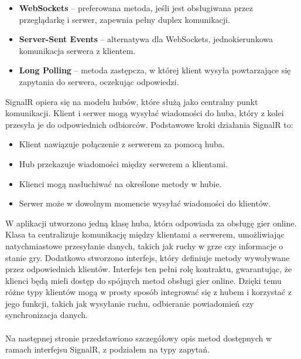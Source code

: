 \documentclass[twoside]{projektInzynierskiMS1}
\begin{document}
\begin{itemize}
    \item \textbf{WebSockets} – preferowana metoda, jeśli jest obsługiwana przez przeglądarkę i serwer, zapewnia pełny duplex komunikacji.
    \item \textbf{Server-Sent Events} – alternatywa dla WebSockets, jednokierunkowa komunikacja serwera z klientem.
    \item \textbf{Long Polling} – metoda zastępcza, w której klient wysyła powtarzające się zapytania do serwera, oczekując odpowiedzi.
\end{itemize}

\noindent
SignalR opiera się na modelu hubów, które służą jako centralny punkt komunikacji. Klient i serwer mogą wysyłać wiadomości do huba, który z kolei przesyła je do odpowiednich odbiorców. Podstawowe kroki działania SignalR to:

\begin{itemize}
    \item Klient nawiązuje połączenie z serwerem za pomocą huba.
    \item Hub przekazuje wiadomości między serwerem a klientami.
    \item Klienci mogą nasłuchiwać na określone metody w hubie.
    \item Serwer może w dowolnym momencie wysyłać wiadomości do klientów.
\end{itemize}

\noindent
W aplikacji utworzono jedną klasę huba, która odpowiada za obsługę gier online. Klasa ta centralizuje komunikację między klientami a serwerem, umożliwiając natychmiastowe przesyłanie danych, takich jak ruchy w grze czy informacje o stanie gry. Dodatkowo stworzono interfejs, który definiuje metody wywoływane przez odpowiednich klientów. Interfejs ten pełni rolę kontraktu, gwarantując, że klienci będą mieli dostęp do spójnych metod obsługi gier online. Dzięki temu różne typy klientów mogą w prosty sposób integrować się z hubem i korzystać z jego funkcji, takich jak wysyłanie ruchu, odbieranie powiadomień czy synchronizacja danych.
\\\\
Na następnej stronie przedstawiono szczegółowy opis metod dostępnych w ramach interfejsu SignalR, z podziałem na typy zapytań.

\newpage
\end{document}
